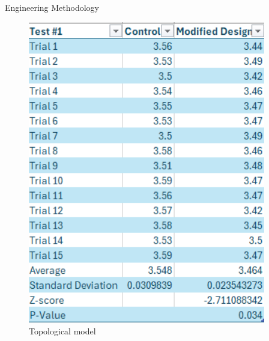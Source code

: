 \documentclass[final, 16pt]{beamer}
\newlength{\colwidth}
\newlength{\twocolwidth}
\begin{document}
\begin{frame}[t]
\begin{columns}[t]
\begin{column}{\twocolwidth}
\begin{block}{Engineering Methodology}
\begin{minipage}[t]{0.48\linewidth}
\begin{multicols}{2}
        \subheader{\hphantom{A}}
        \vspace{-0.3cm}
        \begin{figure}[H]
          \centering
          \includegraphics[height=13.25cm]{img/Topological_Model_Table.png}
          \caption{Topological model}
          \label{fig:topological-table}
          \vfill
        \end{figure}
      \end{multicols}
    \end{minipage}
    \hfill
    \begin{minipage}[t]{0.48\linewidth}
      \begin{multicols}{2}
        \centering
        \begin{figure}[H]
          \centering

\end{figure}
\end{multicols}
\end{minipage}
\end{block}
\end{column}
\end{columns}
\end{frame}
\end{document}
